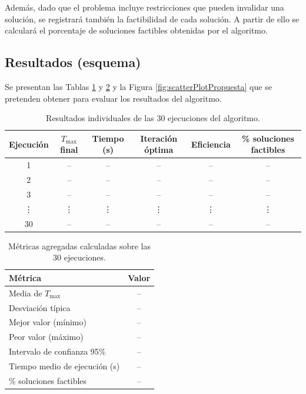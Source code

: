 Además, dado que el problema incluye restricciones que pueden invalidar una solución,
se registrará también la factibilidad de cada solución. A partir de ello se calculará
el porcentaje de soluciones factibles obtenidas por el algoritmo.

\subsection*{Resultados (esquema)}
Se presentan las Tablas \ref{tab:tema2_tabla1} y \ref{tab:tema2_tabla2} y la Figura 
\ref{fig:scatterPlotPropuesta} que se pretenden obtener para evaluar los resultados 
del algoritmo.

\begin{table}[H]
\centering
\begin{tabular}{|c|c|c|c|c|c|}
\hline
Ejecución & $T_{\max}$ final & Tiempo (s) & Iteración óptima & Eficiencia & \% soluciones factibles \\
\hline
1 & -- & -- & -- & -- & --\\
2 & -- & -- & -- & -- & --\\
3 & -- & -- & -- & -- & --\\
\vdots & \vdots & \vdots & \vdots & \vdots & \vdots\\
30 & -- & -- & -- & -- & --\\
\hline
\end{tabular}
\caption{Resultados individuales de las 30 ejecuciones del algoritmo.}\label{tab:tema2_tabla1}
\end{table}

\begin{table}[H]
\centering
\begin{tabular}{|l|c|}
\hline
\textbf{Métrica} & \textbf{Valor} \\
\hline
Media de $T_{\max}$ & -- \\
Desviación típica & -- \\
Mejor valor (mínimo) & -- \\
Peor valor (máximo) & -- \\
Intervalo de confianza 95\% & -- \\
Tiempo medio de ejecución (s) & -- \\
\% soluciones factibles & -- \\
\hline
\end{tabular}
\caption{Métricas agregadas calculadas sobre las 30 ejecuciones.}\label{tab:tema2_tabla2}
\end{table}

